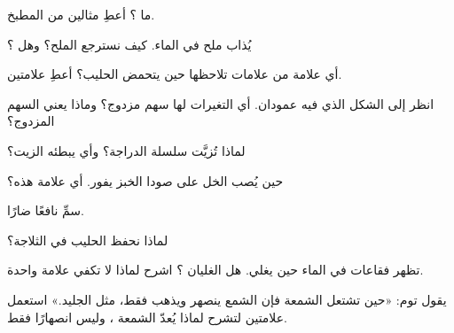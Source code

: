\begin{exercise}[$\star$]\label{exo:g5:irreversible-changes:2}
ما ؟ أعطِ مثالين من المطبخ.
\end{exercise}

\begin{exercise}[$\star$]\label{exo:g5:irreversible-changes:3}
يُذاب ملح في الماء. كيف نسترجع الملح؟ وهل  ؟
\end{exercise}

\begin{exercise}[$\star$]\label{exo:g5:irreversible-changes:4}
أي علامة من علامات  تلاحظها حين يتحمض الحليب؟
أعطِ علامتين.
\end{exercise}

\begin{exercise}[$\star$]\label{exo:g5:irreversible-changes:5}
انظر إلى الشكل الذي فيه عمودان. أي التغيرات لها سهم مزدوج؟ وماذا يعني
السهم المزدوج؟
\end{exercise}

\begin{exercise}[$\star$]\label{exo:g5:irreversible-changes:6}
لماذا تُزيَّت سلسلة الدراجة؟ وأي  يبطئه
الزيت؟
\end{exercise}

\begin{exercise}[$\star$]\label{exo:g5:irreversible-changes:7}
حين يُصب الخل على صودا الخبز يفور. أي علامة هذه؟
\end{exercise}

\begin{exercise}[$\star$]\label{exo:g5:irreversible-changes:8}
سمِّ  نافعًا  ضارًا.
\end{exercise}

\begin{exercise}[$\star$]\label{exo:g5:irreversible-changes:9}
لماذا نحفظ الحليب في الثلاجة؟
\end{exercise}

\begin{exercise}[$\star\star$]\label{exo:g5:irreversible-changes:10}
تظهر فقاعات في الماء حين يغلي. هل الغليان ؟ اشرح لماذا لا
تكفي علامة واحدة.
\end{exercise}

\begin{exercise}[$\star\star$]\label{exo:g5:irreversible-changes:11}
يقول توم: «حين تشتعل الشمعة فإن الشمع ينصهر ويذهب فقط، مثل الجليد.»
استعمل علامتين لتشرح لماذا يُعدّ  الشمعة ، وليس
انصهارًا فقط.
\end{exercise}

